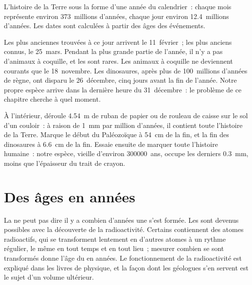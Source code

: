\begin{omfigure}
{\small L'histoire de la Terre sous la forme d'une année du calendrier~:
chaque mois représente environ \num{373}~millions d'années, chaque jour
environ \num{12.4}~millions d'années. Les dates sont calculées à partir
des âges des événements.}
\label{fig:g7:geological-time:calendar}
\end{omfigure}

Les plus anciennes  trouvées à ce jour arrivent le 11~février~; les
plus anciens  connus, le 25~mars. Pendant la plus grande partie de
l'année, il n'y a pas d'animaux à coquille, et les  sont rares.
Les animaux à coquille ne deviennent courants que le 18~novembre. Les
dinosaures, après plus de \num{100}~millions d'années de règne, ont
disparu le 26~décembre, cinq jours avant la fin de l'année. Notre propre
espèce arrive dans la dernière heure du 31~décembre~: le problème de ce
chapitre cherche à quel moment.

\begin{inthelab}
À l'intérieur, déroule \qty{4.54}{m} de ruban de papier ou de rouleau de
caisse sur le sol d'un couloir~: à raison de \qty{1}{mm} par million
d'années, il contient toute l'histoire de la Terre. Marque le début du
Paléozoïque à \qty{54}{cm} de la fin, et la fin des dinosaures à
\qty{6.6}{cm} de la fin. Essaie ensuite de marquer toute l'histoire
humaine~: notre espèce, vieille d'environ \num{300000}~ans, occupe les
derniers \qty{0.3}{mm}, moins que l'épaisseur du trait de crayon.
\end{inthelab}

\section{Des âges en années}

La  ne peut pas dire il y a combien d'années une 
s'est formée. Les  sont devenus possibles avec la découverte
de la radioactivité. Certains  contiennent des atomes radioactifs,
qui se transforment lentement en d'autres atomes à un rythme régulier, le
même en tout temps et en tout lieu~; mesurer combien se sont transformés
donne l'âge du  en années. Le fonctionnement de la radioactivité
est expliqué dans les livres de physique, et la façon dont les géologues
s'en servent est le sujet d'un volume ultérieur.

